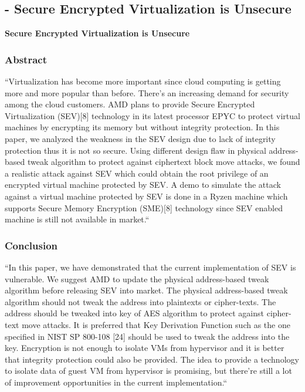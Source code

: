 
\subsection{\cite{du_secure_2017} - Secure Encrypted Virtualization is Unsecure}

\textbf{Secure Encrypted Virtualization is Unsecure}

\subsubsection*{Abstract \cite{du_secure_2017}}
“Virtualization has become more important since cloud computing is getting more and more popular than before. There’s an increasing demand for security among the cloud customers. AMD plans to provide Secure Encrypted Virtualization (SEV)[8] technology in its latest processor EPYC to protect virtual machines by encrypting its memory but without integrity protection. In this paper, we analyzed the weakness in the SEV design due to lack of integrity protection thus it is not so secure. Using different design flaw in physical address-based tweak algorithm to protect against ciphertext block move attacks, we found a realistic attack against SEV which could obtain the root privilege of an encrypted virtual machine protected by SEV. A demo to simulate the attack against a virtual machine protected by SEV is done in a Ryzen machine which supports Secure Memory Encryption (SME)[8] technology since SEV enabled machine is still not available in market.“

\subsubsection*{Conclusion \cite{du_secure_2017}}
“In this paper, we have demonstrated that the current implementation of SEV is vulnerable. We suggest AMD to update the physical address-based tweak algorithm before releasing SEV into market. The physical address-based tweak algorithm should not tweak the address into plaintexts or cipher-texts. The address should be tweaked into key of AES algorithm to protect against cipher-text move attacks. It is preferred that Key Derivation Function such as the one specified in NIST SP 800-108 [24] should be used to tweak the address into the key. Encryption is not enough to isolate VMs from hypervisor and it is better that integrity protection could also be provided. The idea to provide a technology to isolate data of guest VM from hypervisor is promising, but there’re still a lot of improvement opportunities in the current implementation.“
